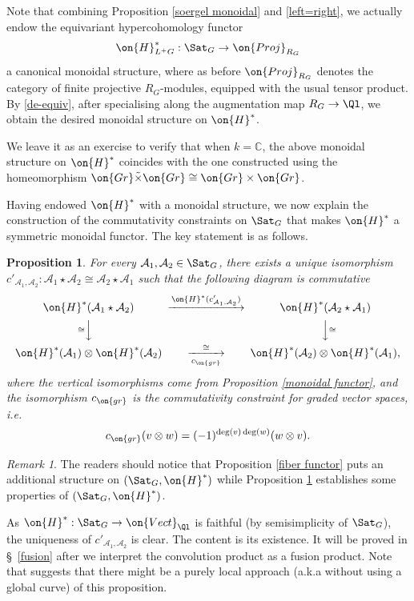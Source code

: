 \documentclass[]{pcmi}
\theoremstyle{plain}
\newtheorem{prop}[equation]{Proposition}
\theoremstyle{remark}
\newtheorem{rmk}[equation]{Remark}
\theoremstyle{definition}
\newcommand{\bC}{{\mathbb C}}
\newcommand{\mA}{{\mathcal A}}
\newcommand{\Gr}{{\on{Gr}}}
\begin{document}
Note that combining Proposition \ref{soergel monoidal} and  \ref{left=right}, we actually endow the equivariant hypercohomology functor
$$\on{H}^*_{L^+G}: \Sat_G\to \on{Proj}_{R_G}$$ 
a canonical monoidal structure, where as before $\on{Proj}_{R_G}$ denotes the category of finite projective $R_G$-modules, equipped with the usual tensor product. 
By \eqref{de-equiv}, after specialising along the augmentation map $R_{G}\to \Ql$, we obtain the desired monoidal structure on $\on{H}^*$.

We leave it as an exercise to verify that when $k=\bC$, the above monoidal structure on $\on{H}^*$ coincides with the one constructed using the homeomorphism $\Gr\tilde\times\Gr\cong \Gr\times \Gr$.


Having endowed $\on{H}^*$ with a monoidal structure, we now explain the construction of the commutativity constraints on $\Sat_G$ that makes $\on{H}^*$ a symmetric monoidal functor. The key statement is as follows.
\begin{prop}\label{existence of comm}
For every $\mA_1,\mA_2\in\Sat_G$, there exists a unique isomorphism $c'_{\mA_1,\mA_2}:\mA_1\star\mA_2\cong\mA_2\star\mA_1$ such that the following diagram is commutative
\[\begin{CD}
\on{H}^*(\mA_1\star\mA_2)@>\on{H}^*(c'_{\mA_1,\mA_2})>>\on{H}^*(\mA_2\star\mA_1)\\
@V\cong VV@VV\cong V\\
\on{H}^*(\mA_1)\otimes\on{H}^*(\mA_2)@>\cong>c_{\on{gr}}>\on{H}^*(\mA_2)\otimes\on{H}^*(\mA_1),
\end{CD}\]
where the vertical isomorphisms come from Proposition \ref{monoidal functor}, and the isomorphism $c_{\on{gr}}$ is the commutativity constraint for graded vector spaces, i.e. 
$$c_{\on{gr}}(v\otimes w)=(-1)^{\deg(v)\deg(w)}(w\otimes v).$$
\end{prop}
\begin{rmk}The readers should notice that Proposition \ref{fiber functor}  puts an additional structure on $(\Sat_G, \on{H}^*)$ while Proposition \ref{existence of comm} establishes some properties of $(\Sat_G,\on{H}^*)$.
\end{rmk}
As $\on{H}^*:\Sat_G\to\on{Vect}_{\Ql}$ is faithful (by semisimplicity of $\Sat_G$), the uniqueness of $c'_{\mA_1,\mA_2}$ is clear. The content is its existence. It will be proved in \S~\ref{fusion} after we interpret the convolution product as a fusion product. Note that \cite[\S~2.4]{Z14} suggests that there might be a purely local approach (a.k.a without using a global curve) of this proposition. 
\end{document}
